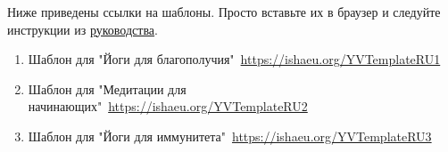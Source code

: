 Ниже приведены ссылки на шаблоны. Просто вставьте их в браузер и следуйте инструкции из \hyperref[sec:templates]{руководства}.
\begin{enumerate}\label{sec:templatesRefs}
    \item Шаблон для "Йоги для благополучия"\ \href{https://ishaeu.org/YVTemplateRU1}{\small https://ishaeu.org/YVTemplateRU1} 
    \item Шаблон для "Медитации для начинающих"\ \href{https://ishaeu.org/YVTemplateRU2}{\small https://ishaeu.org/YVTemplateRU2}
    \item Шаблон для "Йоги для иммунитета"\ \href{https://ishaeu.org/YVTemplateRU3}{\small https://ishaeu.org/YVTemplateRU3}  

\end{enumerate}

